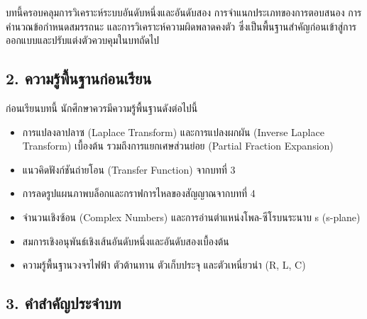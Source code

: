 บทนี้ครอบคลุมการวิเคราะห์ระบบอันดับหนึ่งและอันดับสอง การจำแนกประเภทของการตอบสนอง การคำนวณข้อกำหนดสมรรถนะ และการวิเคราะห์ความผิดพลาดคงตัว ซึ่งเป็นพื้นฐานสำคัญก่อนเข้าสู่การออกแบบและปรับแต่งตัวควบคุมในบทถัดไป



\subsection{2. ความรู้พื้นฐานก่อนเรียน}

ก่อนเรียนบทนี้ นักศึกษาควรมีความรู้พื้นฐานดังต่อไปนี้

\begin{itemize}
    \item การแปลงลาปลาซ (Laplace Transform) และการแปลงผกผัน (Inverse Laplace Transform) เบื้องต้น รวมถึงการแยกเศษส่วนย่อย (Partial Fraction Expansion)
    \item แนวคิดฟังก์ชันถ่ายโอน (Transfer Function) จากบทที่ 3
    \item การลดรูปแผนภาพบล็อกและกราฟการไหลของสัญญาณจากบทที่ 4
    \item จำนวนเชิงซ้อน (Complex Numbers) และการอ่านตำแหน่งโพล-ซีโรบนระนาบ s (s-plane)
    \item สมการเชิงอนุพันธ์เชิงเส้นอันดับหนึ่งและอันดับสองเบื้องต้น
    \item ความรู้พื้นฐานวงจรไฟฟ้า ตัวต้านทาน ตัวเก็บประจุ และตัวเหนี่ยวนำ (R, L, C)
\end{itemize}



\subsection{3. คำสำคัญประจำบท}

